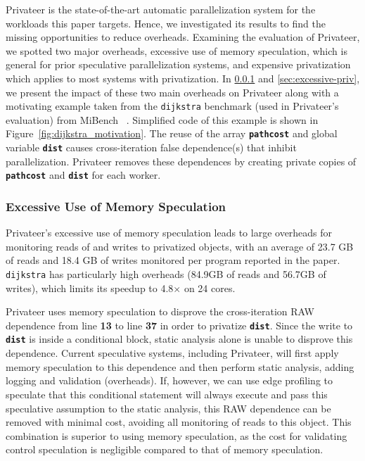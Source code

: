 Privateer is the state-of-the-art automatic parallelization system for the
workloads this paper targets. Hence, we investigated its results to find
the missing opportunities to reduce overheads.
%
Examining the evaluation of Privateer, we spotted two major overheads,
excessive use of memory speculation, which is general for prior speculative
parallelization systems, and expensive privatization which applies to
most systems with privatization.
%
In \ref{sec:excessive-memory-spec} and \ref{sec:excessive-priv}, we present
the impact of these two main overheads on Privateer along with a motivating
example taken from the \texttt{dijkstra} benchmark (used in Privateer's
evaluation) from MiBench ~\cite{guthaus:2001:iiwsc}. Simplified code of this example is
shown in Figure~\ref{fig:dijkstra_motivation}. The reuse of the array
\texttt{\textbf{pathcost}} and global variable \texttt{\textbf{dist}}
causes cross-iteration false dependence(s) that inhibit parallelization.
Privateer removes these dependences by creating private copies of
\texttt{\textbf{pathcost}} and \texttt{\textbf{dist}} for each worker.

\subsubsection{Excessive Use of Memory Speculation}
\label{sec:excessive-memory-spec}

Privateer's excessive use of memory speculation leads to large overheads
for monitoring reads of and writes to privatized objects, with an average
of 23.7 GB of reads and 18.4 GB of writes monitored per program reported in
the paper. \texttt{dijkstra} has particularly high overheads (84.9GB of
reads and 56.7GB of writes), which limits its speedup to 4.8$\times$ on 24
cores.


Privateer uses memory speculation to disprove the cross-iteration
RAW dependence from line \textbf{13} to line \textbf{37} in order to
privatize \texttt{\textbf{dist}}. Since the write to \texttt{\textbf{dist}}
is inside a conditional block, static analysis alone is unable to disprove
this dependence. Current speculative systems, including Privateer, will
first apply memory speculation to this dependence and then perform static
analysis, adding logging and validation (overheads). If, however, we can
use edge profiling to speculate that this conditional statement will always
execute and pass this speculative assumption to the static analysis, this
RAW dependence can be removed with minimal cost, avoiding all monitoring of
reads to this object. This combination is superior to using memory
speculation, as the cost for validating control speculation is negligible
compared to that of memory speculation.

